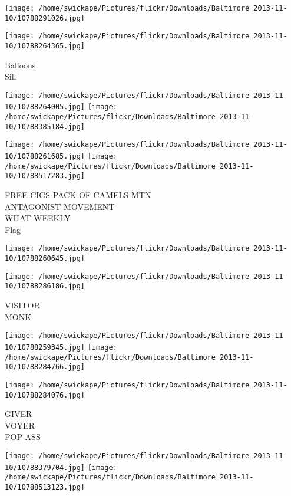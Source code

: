 \documentclass[10pt,letterpaper]{article}
\begin{document}
\texttt{[image: /home/swickape/Pictures/flickr/Downloads/Baltimore 2013-11-10/10788291026.jpg]}

\vspace{0.25in}
\texttt{[image: /home/swickape/Pictures/flickr/Downloads/Baltimore 2013-11-10/10788264365.jpg]}

Balloons\\
Sill\\
\pagebreak

\texttt{[image: /home/swickape/Pictures/flickr/Downloads/Baltimore 2013-11-10/10788264005.jpg]}
\texttt{[image: /home/swickape/Pictures/flickr/Downloads/Baltimore 2013-11-10/10788385184.jpg]}

\texttt{[image: /home/swickape/Pictures/flickr/Downloads/Baltimore 2013-11-10/10788261685.jpg]}
\texttt{[image: /home/swickape/Pictures/flickr/Downloads/Baltimore 2013-11-10/10788517283.jpg]}

FREE CIGS PACK OF CAMELS MTN\\
ANTAGONIST MOVEMENT\\
WHAT WEEKLY\\
Flag\\
\pagebreak

\texttt{[image: /home/swickape/Pictures/flickr/Downloads/Baltimore 2013-11-10/10788260645.jpg]}

\vspace{0.25in}
\texttt{[image: /home/swickape/Pictures/flickr/Downloads/Baltimore 2013-11-10/10788286186.jpg]}

VISITOR\\
MONK\\
\pagebreak

\texttt{[image: /home/swickape/Pictures/flickr/Downloads/Baltimore 2013-11-10/10788259345.jpg]}
\texttt{[image: /home/swickape/Pictures/flickr/Downloads/Baltimore 2013-11-10/10788284766.jpg]}

\vspace{0.25in}
\texttt{[image: /home/swickape/Pictures/flickr/Downloads/Baltimore 2013-11-10/10788284076.jpg]}

GIVER\\
VOYER\\
POP ASS\\
\pagebreak

\texttt{[image: /home/swickape/Pictures/flickr/Downloads/Baltimore 2013-11-10/10788379704.jpg]}
\texttt{[image: /home/swickape/Pictures/flickr/Downloads/Baltimore 2013-11-10/10788513123.jpg]}
\end{document}
